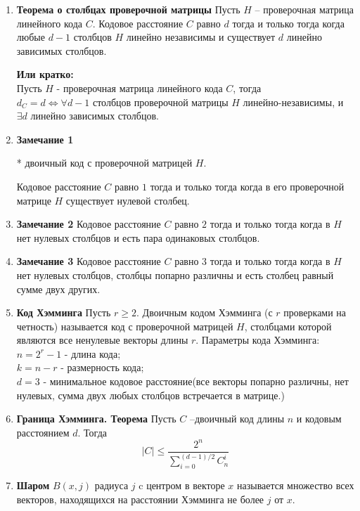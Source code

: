 \documentclass[a4paper, 12pt]{report}
\begin{document}
\begin{enumerate}


\item \textbf{Теорема о столбцах проверочной матрицы}
Пусть $H$ – проверочная матрица линейного кода $C$. Кодовое
расстояние $C$ равно $d$ тогда и только тогда когда любые $d - 1$
столбцов $H$ линейно независимы и существует $d$ линейно
зависимых столбцов.

\textbf{Или кратко:}\\
Пусть $H$ - проверочная матрица линейного кода $C$, тогда\\
$d_{C} = d \Leftrightarrow \forall d-1$ столбцов проверочной матрицы $H$ линейно-независимы, и $\exists d$ линейно зависимых столбцов.


\item \textbf{Замечание 1}

* двоичный код с проверочной матрицей $H$.

Кодовое расстояние $C$ равно $1$ тогда и только тогда когда в
его проверочной матрице $H$ существует нулевой столбец.

\item \textbf{Замечание 2}
Кодовое расстояние $C$ равно $2$ тогда и только тогда когда в
$H$ нет нулевых столбцов и есть пара одинаковых столбцов.

\item \textbf{Замечание 3}
Кодовое расстояние $C$ равно $3$ тогда и только тогда когда в
$H$ нет нулевых столбцов, столбцы попарно различны и есть
столбец равный сумме двух других.

\item \textbf{Код Хэмминга}
Пусть $r \geq 2$. Двоичным кодом Хэмминга (с $r$ проверками на
четность) называется код с проверочной матрицей $H$,
столбцами которой являются все ненулевые векторы длины $r$.
Параметры кода Хэмминга:\\
$n = 2^{r} - 1$ - длина кода;\\
$k = n - r$ - размерность кода;\\
$d = 3$ - минимальное кодовое расстояние(все векторы попарно различны, нет нулевых, сумма двух любых столбцов встречается в матрице.)

\item \textbf{Граница Хэмминга. Теорема}
Пусть $C$ –двоичный код длины $n$ и кодовым расстоянием $d$.
Тогда
\[  |C| \leq \frac {2^n} {{\sum_{i = 0}^{(d - 1)/2} C_n^i}} \]


\item \textbf{Шаром }  $B(x, j)$ радиуса $j$ c центром в векторе $x$ называется
множество всех векторов, находящихся на расстоянии
Хэмминга не более $j$ от $x$.


\end{enumerate}
\end{document}

